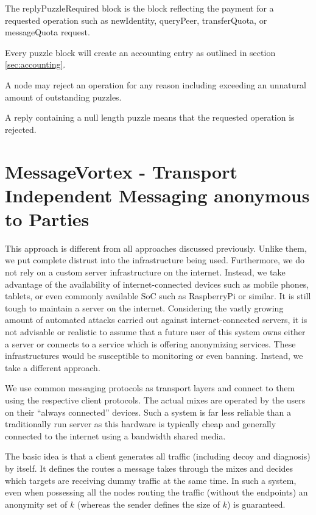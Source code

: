 The replyPuzzleRequired block is the block reflecting the payment for a requested operation such as newIdentity, queryPeer, transferQuota, or messageQuota request.

Every puzzle block will create an accounting entry as outlined in section \ref{sec:accounting}. 

A node may reject an operation for any reason including exceeding an unnatural amount of outstanding puzzles.

A reply containing a null length puzzle means that the requested operation is rejected.

\chapter{MessageVortex - Transport Independent Messaging anonymous to \texorpdfstring{}{3rd} Parties\label{sec:spec}}
This approach is different from all approaches discussed previously. Unlike them, we put complete distrust into the infrastructure being used. Furthermore, we do not rely on a custom server infrastructure on the internet. Instead, we take advantage of the availability of internet-connected devices such as mobile phones, tablets, or even commonly available SoC such as RaspberryPi or similar. It is still tough to maintain a server on the internet. Considering the vastly growing amount of automated attacks carried out against internet-connected servers, it is not advisable or realistic to assume that a future user of this system owns either a server or connects to a service which is offering anonymizing services. These infrastructures would be susceptible to monitoring or even banning. Instead, we take a different approach.

We use common messaging protocols as transport layers and connect to them using the respective client protocols. The actual mixes are operated by the users on their ``always connected'' devices. Such a system is far less reliable than a traditionally run server as this hardware is typically cheap and generally connected to the internet using a bandwidth shared media.

The basic idea is that a client generates all traffic (including decoy and diagnosis) by itself. It defines the routes a message takes through the mixes and decides which targets are receiving dummy traffic at the same time. In such a system, even when possessing all the nodes routing the traffic (without the endpoints) an anonymity set of $k$ (whereas the sender defines the size of $k$) is guaranteed.

